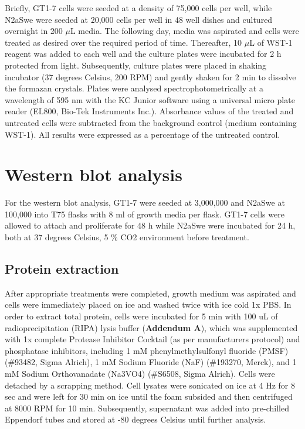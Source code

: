 Briefly,  GT1-7 cells were seeded at a density of 75,000 cells per well, while N2aSwe were seeded at 20,000 cells per well in 48 well dishes and cultured overnight in 200 $\mu$L media. The following day, media was aspirated and cells were treated as desired over the required period of time. Thereafter, 10 $\mu$L of WST-1 reagent was added to each well and the culture plates were incubated for 2 h protected from light. Subsequently, culture plates were placed in shaking incubator (37 degrees Celsius, 200 RPM) and gently shaken for 2 min to dissolve the formazan crystals. Plates were analysed spectrophotometrically at a wavelength of 595 nm with the KC Junior software using a universal micro plate reader (EL800, Bio-Tek Instruments Inc.). Absorbance values of the treated and untreated cells were subtracted from the background control (medium containing WST-1). All results were expressed as a percentage of the untreated control.

\section{Western blot analysis}
For the western blot analysis, GT1-7 were seeded at 3,000,000 and N2aSwe at 100,000 into T75 flasks with 8 ml of growth media per flask.  GT1-7 cells were allowed to attach and proliferate for 48 h while N2aSwe were incubated for 24 h, both at 37 degrees Celsius, 5 \% CO2 environment before treatment.

\subsection{Protein extraction}
After appropriate treatments were completed, growth medium was aspirated and cells were immediately placed on ice and washed twice with ice cold 1x PBS. In order to extract total protein, cells were incubated for 5 min with 100 uL of radioprecipitation (RIPA) lysis buffer (\textbf{Addendum A}), which was supplemented with 1x complete Protease Inhibitor Cocktail (as per manufacturers protocol) and phosphatase inhibitors, including 1 mM phenylmethylsulfonyl fluoride (PMSF) (\#93482, Sigma Alrich), 1 mM Sodium Fluoride (NaF) (\#193270, Merck), and 1 mM Sodium Orthovanadate (Na3VO4) (\#S6508, Sigma Alrich). Cells were detached by a scrapping method. Cell lysates were sonicated on ice at 4 Hz for 8 sec and were left for 30 min on ice until the foam subsided and then centrifuged at 8000 RPM for 10 min. Subsequently, supernatant was added into pre-chilled Eppendorf tubes and stored at -80 degrees Celsius until further analysis.

